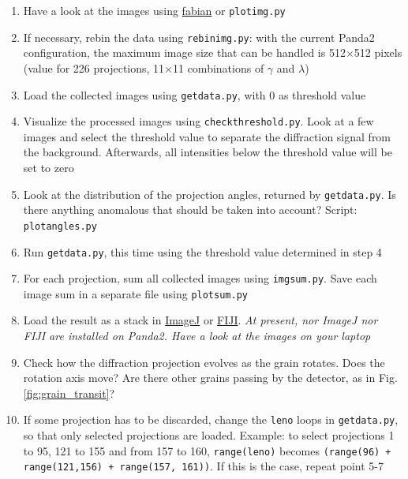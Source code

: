 \documentclass[11pt]{scrartcl}
\begin{document}
\begin{enumerate}
    \item Have a look at the images using \href{https://sourceforge.net/p/fable/wiki/fabian/}{fabian} or {\texttt{plot\textunderscore img.py}}
    \item If necessary, rebin the data using {\texttt{rebin\textunderscore img.py}}: with the current Panda2 configuration, the maximum image size that can be handled is 512$\times$512 pixels (value for 226 projections, 11$\times$11 combinations of $\gamma$ and $\lambda$)
    \item Load the collected images using {\texttt{getdata.py}}, with 0 as threshold value
    \item Visualize the processed images using {\texttt{check\textunderscore threshold.py}}. Look at a few images and select the threshold value to separate the diffraction signal from the background. Afterwards, all intensities below the threshold value will be set to zero
    \item Look at the distribution of the projection angles, returned by {\texttt{getdata.py}}. Is there anything anomalous that should be taken into account? Script: {\texttt{plot\textunderscore angles.py}}
    \item Run {\texttt{getdata.py}}, this time using the threshold value determined in step 4
    \item For each projection, sum all collected images using {\texttt{img\textunderscore sum.py}}. Save each image sum in a separate file using {\texttt{plot\textunderscore sum.py}}
    \item Load the result as a stack in \href{https://imagej.nih.gov/ij/}{ImageJ} or \href{https://imagej.net/Fiji}{\footnotesize{FIJI}}. {\emph{At present, nor ImageJ nor {\footnotesize{FIJI}} are installed on Panda2. Have a look at the images on your laptop}}
    \item Check how the diffraction projection evolves as the grain rotates. Does the rotation axis move? Are there other grains passing by the detector, as in Fig. \ref{fig:grain_transit}? 
    \item If some projection has to be discarded, change the {\texttt{leno}} loops in {\texttt{getdata.py}}, so that only selected projections are loaded. Example: to select projections 1 to 95, 121 to 155 and from 157 to 160, {\texttt{range(leno)}} becomes {\texttt{(range(96) + range(121,156) + range(157, 161))}}. If this is the case, repeat point 5-7
\end{enumerate}
   
\end{document}
